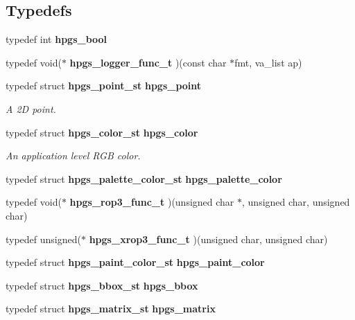 \subsection*{Typedefs}
\begin{CompactItemize}
\item 
typedef int \textbf{hpgs\_\-bool}\label{group__base_g29a7aec912fb7a5ad0e82601a18b39ce}

\item 
typedef void($\ast$ \textbf{hpgs\_\-logger\_\-func\_\-t} )(const char $\ast$fmt, va\_\-list ap)\label{group__base_g563fc8cbc02904086ce0f3080c697db9}

\item 
typedef struct {\bf hpgs\_\-point\_\-st} {\bf hpgs\_\-point}
\begin{CompactList}\small\item\em A 2D point. \item\end{CompactList}\item 
typedef struct {\bf hpgs\_\-color\_\-st} {\bf hpgs\_\-color}
\begin{CompactList}\small\item\em An application level RGB color. \item\end{CompactList}\item 
typedef struct {\bf hpgs\_\-palette\_\-color\_\-st} \textbf{hpgs\_\-palette\_\-color}\label{group__base_gde4e9715040c0819f79ca4f2efddf250}

\item 
typedef void($\ast$ \textbf{hpgs\_\-rop3\_\-func\_\-t} )(unsigned char $\ast$, unsigned char, unsigned char)\label{group__base_g764146c86d8ef0cd9adc8b6be930f872}

\item 
typedef unsigned($\ast$ \textbf{hpgs\_\-xrop3\_\-func\_\-t} )(unsigned char, unsigned char)\label{group__base_g972157f576ddf01954e520bbb7ec5498}

\item 
typedef struct {\bf hpgs\_\-paint\_\-color\_\-st} \textbf{hpgs\_\-paint\_\-color}\label{group__base_gdb45ff83823a45567588dd72d29b91cd}

\item 
typedef struct {\bf hpgs\_\-bbox\_\-st} \textbf{hpgs\_\-bbox}\label{group__base_g0faf36b0ed91c6b5fb9b6df45e0df2aa}

\item 
typedef struct {\bf hpgs\_\-matrix\_\-st} \textbf{hpgs\_\-matrix}\label{group__base_g69971a93db7c8418772cdf2f064a9234}


\end{CompactItemize}
